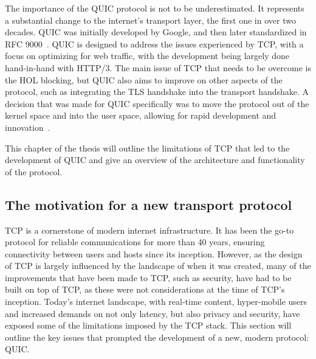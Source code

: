 \documentclass[english, 12pt, a4paper, elec, utf8, a-2b, online]{aaltothesis}
\begin{document}
The importance of the QUIC protocol is not to be underestimated. It represents
a substantial change to the internet's transport layer, the first one in over
two decades. QUIC was initially developed by Google, and then later standardized
in RFC 9000~\cite{rfc9000}. QUIC is designed to address the issues experienced
by TCP, with a focus on optimizing for web traffic, with the development being
largely done hand-in-hand with HTTP/3. The main issue of TCP that needs to be overcome is the
HOL blocking, but  QUIC also aims to improve on other aspects of the protocol,
such as integrating the TLS handshake into the transport handshake. A decision
that was made for QUIC specifically was to move the protocol out of the kernel
space and into the user space, allowing for rapid development and innovation~\cite{quic_transport_protocol_design}.

This chapter of the thesis will outline the limitations of TCP that led to the
development of QUIC and give an overview of the architecture and functionality of
the protocol.

\subsection{The motivation for a new transport protocol \label{quic_motivation}}
TCP is a cornerstone of modern internet infrastructure. It has been the go-to
protocol for reliable communications for more than 40 years, ensuring connectivity between users and hosts
since its inception. However, as the design of TCP is largely influenced by the
landscape of when it was created, many of the improvements that have been made to TCP,
such as security, have had to be built on top of TCP, as these were not considerations
at the time of TCP's inception. Today's internet landscape, with real-time content,
hyper-mobile users and increased demands on not only latency, but also privacy and security, have exposed
some of the limitations imposed by the TCP stack. This section will outline the
key issues that prompted the development of a new, modern protocol: QUIC.
\end{document}
